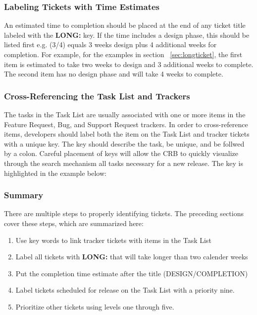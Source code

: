 \subsubsection{Labeling Tickets with Time Estimates}

An estimated time to completion should be placed at the end of any ticket title labeled with
the {\bf LONG:} key. If the time includes a design phase, this should be listed first
e.g. (3/4) equals 3 weeks design plus 4 additional weeks for completion.  For example,
for the examples in section ~\ref{sec:longticket}, the first item is estimated to take two weeks
to design and 3 additional weeks to complete. The second item has no design phase and
will take 4 weeks to complete. 

\subsubsection{Cross-Referencing the Task List and Trackers}

The tasks in the Task List are usually associated with
one or more items in the Feature Request, Bug, and Support Request 
trackers.  In order to cross-reference items, developers should label
both the item on the Task List and tracker tickets with a 
unique key. The key should describe the task, be unique, and be follwed by a
colon. Careful placement of keys will allow the CRB to quickly visualize
through the search mechanism all tasks necessary for a new release. The key
is highlighted in the example below:

\subsubsection{Summary}
There are multiple steps to properly identifying tickets. The preceding sections
cover these steps, which are summarized here:
\begin{enumerate}
\item Use key words to link tracker tickets with items in the Task List
\item Label all tickets with {\bf LONG:} that will take longer than two calender weeks
\item Put the completion time estimate after the title (DESIGN/COMPLETION)
\item Label tickets scheduled for release on the Task List with a priority nine.
\item Prioritize other tickets using levels one through five.
\end {enumerate}


